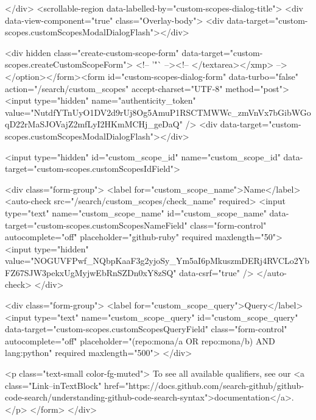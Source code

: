 </div>
      <scrollable-region data-labelled-by="custom-scopes-dialog-title">
        <div data-view-component="true" class="Overlay-body">        <div data-target="custom-scopes.customScopesModalDialogFlash"></div>

        <div hidden class="create-custom-scope-form" data-target="custom-scopes.createCustomScopeForm">
        <!-- '"` --><!-- </textarea></xmp> --></option></form><form id="custom-scopes-dialog-form" data-turbo="false" action="/search/custom_scopes" accept-charset="UTF-8" method="post"><input type="hidden" name="authenticity_token" value="NutdfYTnUyO1DV2d9rUj8Og5AmuP1RSCTMWWc_zmVnVx7bGibWGoqD22rMaSJOVajZ2mfLyI2HKmMCHj_geDaQ" />
          <div data-target="custom-scopes.customScopesModalDialogFlash"></div>

          <input type="hidden" id="custom_scope_id" name="custom_scope_id" data-target="custom-scopes.customScopesIdField">

          <div class="form-group">
            <label for="custom_scope_name">Name</label>
            <auto-check src="/search/custom_scopes/check_name" required>
              <input
                type="text"
                name="custom_scope_name"
                id="custom_scope_name"
                data-target="custom-scopes.customScopesNameField"
                class="form-control"
                autocomplete="off"
                placeholder="github-ruby"
                required
                maxlength="50">
              <input type="hidden" value="NOGUVFPwf_NQbpKaaF3g2yjoSy_Ym5aI6pMkuszmDERj4RVCLo2YbFZ67SJW3pekxUgMyjwEbRnSZDn0xY8zSQ" data-csrf="true" />
            </auto-check>
          </div>

          <div class="form-group">
            <label for="custom_scope_query">Query</label>
            <input
              type="text"
              name="custom_scope_query"
              id="custom_scope_query"
              data-target="custom-scopes.customScopesQueryField"
              class="form-control"
              autocomplete="off"
              placeholder="(repo:mona/a OR repo:mona/b) AND lang:python"
              required
              maxlength="500">
          </div>

          <p class="text-small color-fg-muted">
            To see all available qualifiers, see our <a class="Link--inTextBlock" href="https://docs.github.com/search-github/github-code-search/understanding-github-code-search-syntax">documentation</a>.
          </p>
</form>        </div>

